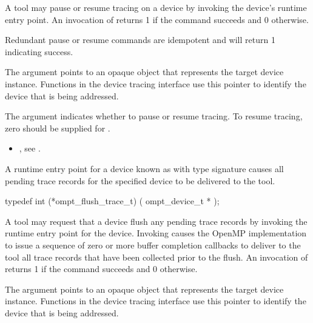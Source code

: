 \descr

A tool may pause or resume tracing on a device by invoking the device's
 runtime entry point.
An invocation of  returns 1 if the command
succeeds and 0 otherwise.

Redundant pause or resume commands are idempotent and will
return 1 indicating success.

\argdesc
The  argument points to an opaque object that represents
the target device instance. Functions in the device tracing interface
use this pointer to identify the device that is being addressed.

The argument  indicates whether to pause or
resume tracing.
To resume tracing, zero should be supplied for .

\crossreferences
\begin{itemize}
\item {},
see .
\end{itemize}

\label{sec:ompt_flush_trace_t}

\summary
A runtime entry point for a device known as 
with type signature  causes all pending trace 
records for the specified device to be delivered to the tool.

\begin{ccppspecific}
\begin{omptInquiry}
typedef int (*ompt_flush_trace_t) (
  ompt_device_t *
);
\end{omptInquiry}
\end{ccppspecific}

\descr

A tool may request that a device flush any pending trace records
by invoking the  runtime entry point for the device.
Invoking  causes the OpenMP implementation to issue a sequence 
of zero or more buffer completion callbacks to deliver to the tool all trace records 
that have been collected prior to the flush.
An invocation of  returns 1 if the command
succeeds and 0 otherwise.

\argdesc
The  argument points to an opaque object that represents
the target device instance. Functions in the device tracing interface
use this pointer to identify the device that is being addressed.

